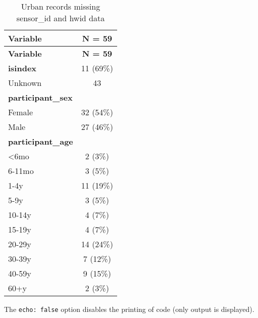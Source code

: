 \documentclass[
  letterpaper,
  DIV=11,
  numbers=noendperiod]{scrartcl}
\begin{document}
\hypertarget{tbl-urban-missing-ids}{}
\begin{longtable}[]{@{}lc@{}}
\caption{\label{tbl-urban-missing-ids}Urban records missing sensor\_id
and hwid data}\tabularnewline
\toprule()
\textbf{Variable} & \textbf{N = 59} \\
\midrule()
\endfirsthead
\toprule()
\textbf{Variable} & \textbf{N = 59} \\
\midrule()
\endhead
\textbf{isindex} & 11 (69\%) \\
Unknown & 43 \\
\textbf{participant\_sex} & \\
Female & 32 (54\%) \\
Male & 27 (46\%) \\
\textbf{participant\_age} & \\
\textless6mo & 2 (3\%) \\
6-11mo & 3 (5\%) \\
1-4y & 11 (19\%) \\
5-9y & 3 (5\%) \\
10-14y & 4 (7\%) \\
15-19y & 4 (7\%) \\
20-29y & 14 (24\%) \\
30-39y & 7 (12\%) \\
40-59y & 9 (15\%) \\
60+y & 2 (3\%) \\
\bottomrule()
\end{longtable}

The \texttt{echo:\ false} option disables the printing of code (only
output is displayed).
\end{document}
